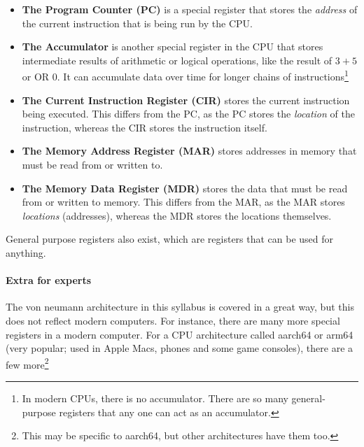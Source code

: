 \documentclass[../main.tex]{subfiles}
\begin{document}
\begin{itemize}
    \item \textbf{The Program Counter (PC)} is a special register that stores the \emph{address} of the current instruction that is being run by the CPU.
\item \textbf{The Accumulator} is another special register in the CPU that stores intermediate results of arithmetic or logical operations, like the result of $3+5$ or { OR 0}. It can accumulate data over time for longer chains of instructions\footnote{In modern CPUs, there is no accumulator. There are so many general-purpose registers that any one can act as an accumulator.}
    \item \textbf{The Current Instruction Register (CIR)} stores the current instruction being executed. This differs from the PC, as the PC stores the \emph{location} of the instruction, whereas the CIR stores the instruction itself.
    \item \textbf{The Memory Address Register (MAR)} stores addresses in memory that must be read from or written to.
    \item \textbf{The Memory Data Register (MDR)} stores the data that must be read from or written to memory. This differs from the MAR, as the MAR stores \emph{locations} (addresses), whereas the MDR stores the locations themselves.
\end{itemize}

General purpose registers also exist, which are registers that can be used for anything.

\paragraph{Extra for experts}

The von neumann architecture in this syllabus is covered in a great way, but this does not reflect modern computers. For instance, there are many more special registers in a modern computer. For a CPU architecture called {\ccmono aarch64} or {\ccmono arm64} (very popular; used in Apple Macs, phones and some game consoles), there are a few more\footnote{This may be specific to aarch64, but other architectures have them too.}
\end{document}
